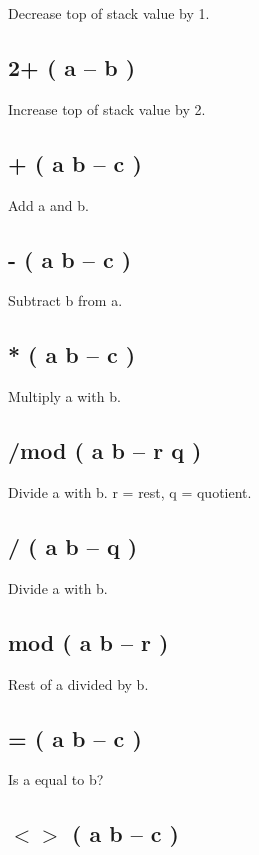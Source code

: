 Decrease top of stack value by 1.

\subsection{2+ ( a -- b )}

Increase top of stack value by 2.

\subsection{+ ( a b -- c )}

Add a and b.

\subsection{- ( a b -- c )}

Subtract b from a.

\subsection{* ( a b -- c )}

Multiply a with b.

\subsection{/mod ( a b -- r q )}

Divide a with b. r = rest, q = quotient.

\subsection{/ ( a b -- q )}

Divide a with b.

\subsection{mod ( a b -- r )}

Rest of a divided by b.

\subsection{= ( a b -- c )}

Is a equal to b?

\subsection{$<>$ ( a b -- c )}

